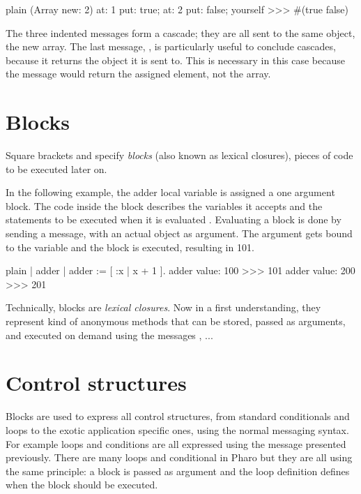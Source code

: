 \documentclass[10pt,twoside,english]{_support/latex/sbabook/sbabook}
\begin{document}
\begin{displaycode}{plain}
(Array new: 2)
	at: 1 put: true;
	at: 2 put: false;
	yourself
>>> #(true false)
\end{displaycode}

	
The three indented messages form a cascade; they are all sent to the same object, the new array.
The last message, , is particularly useful to conclude cascades, because it returns the object it is sent to.
This is necessary in this case because the  message would return the assigned element, not the array.
\section{Blocks}
Square brackets \textcode{{[}} and \textcode{{]}}  specify \textit{blocks} (also known as lexical closures), pieces of code to be executed later on.

In the following example, the adder local variable is assigned a one argument block. The code inside the block describes the variables it accepts  and the statements to be executed when it is evaluated . Evaluating a block is done by sending a message,  with an actual object as argument. The argument gets bound to the variable and the block is executed, resulting in 101.

\begin{displaycode}{plain}
| adder |
adder := [ :x | x + 1 ].
adder value: 100
>>> 101
adder value: 200
>>> 201
\end{displaycode}

\begin{important}
Technically, blocks are \textit{lexical closures}. Now in a first understanding, they represent kind of anonymous methods that can be stored, passed as arguments, and executed on demand using the messages , ...
\end{important}
\section{Control structures}
Blocks are used to express all control structures, from standard conditionals and loops to the exotic application specific ones, using the normal messaging syntax. For example loops and conditions are all expressed using the message presented previously. There are many loops and conditional in Pharo but they are all using the same principle: a block is passed as argument and the loop definition defines when the block should be executed. 
\end{document}
